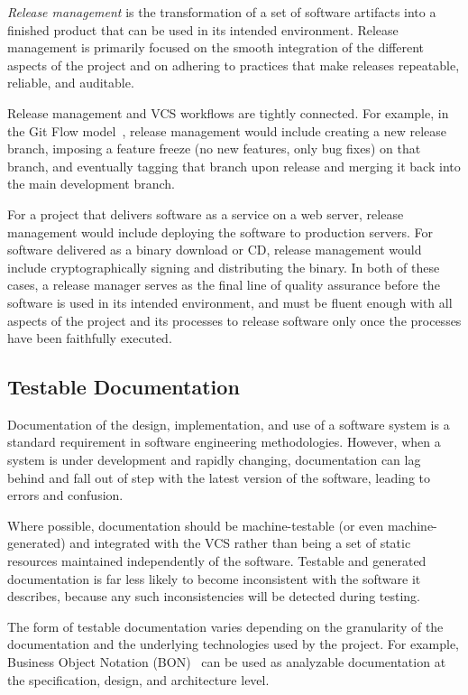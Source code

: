 \emph{Release management} is the transformation of a set of software
artifacts into a finished product that can be used in its intended
environment. Release management is primarily focused on the smooth
integration of the different aspects of the project and on adhering to
practices that make releases repeatable, reliable, and auditable.

Release management and VCS workflows are tightly connected. For
example, in the Git Flow model~\cite{atlassianworkflow}, release
management would include creating a new release branch, imposing a
feature freeze (no new features, only bug fixes) on that branch, and
eventually tagging that branch upon release and merging it back into
the main development branch.

For a project that delivers software as a service on a web server,
release management would include deploying the software to production
servers. For software delivered as a binary download or CD, release
management would include cryptographically signing and distributing
the binary. In both of these cases, a release manager serves as the
final line of quality assurance before the software is used in its
intended environment, and must be fluent enough with all aspects of
the project and its processes to release software only once the
processes have been faithfully executed.

\subsection{Testable Documentation}

Documentation of the design, implementation, and use of a software
system is a standard requirement in software engineering
methodologies. However, when a system is under development and rapidly
changing, documentation can lag behind and fall out of step with the
latest version of the software, leading to errors and confusion.

Where possible, documentation should be machine-testable (or even
machine-generated) and integrated with the VCS rather than being a set
of static resources maintained independently of the software. Testable
and generated documentation is far less likely to become inconsistent with
the software it describes, because any such inconsistencies will be
detected during testing.

The form of testable documentation varies depending on the granularity
of the documentation and the underlying technologies used by the
project. For example, Business Object Notation
(BON)~\cite{walden1995seamless} can be used as analyzable
documentation at the specification, design, and architecture level.

